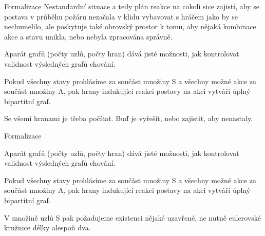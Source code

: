 ﻿\documentclass[a4paper]{beamer}
\def\uv#1{\char92\relax #1\char34\relax}
\begin{document}
\begin{frame}{Formalizace}
    Nestandardní situace a tedy plán \uv{reakce na cokoli} sice zajistí, aby se postava v průběhu požáru nezačala v klidu vybavovat s hráčem jako by se nechumelilo, ale poskytuje také obrovský prostor k tomu, aby nějaká kombinace akce a stavu unikla, nebo nebyla zpracována správně.
    
    \vfill
    Aparát grafů (počty uzlů, počty hran) dává jisté možnosti, jak kontrolovat validnost výsledných grafů chování.
    
    \vfill
    Pokud všechny stavy prohlásíme za součást množiny S a všechny možné akce za součást množiny A, pak hrany indukující reakci postavy na akci vytváří úplný bipartitní graf. 

    Se všemi hranami je třeba počítat. Buď je vyřešit, nebo zajistit, aby nenastaly. 
\end{frame}

\begin{frame}{Formalizace}

    \vfill
    Aparát grafů (počty uzlů, počty hran) dává jisté možnosti, jak kontrolovat validnost výsledných grafů chování.
    
    \vfill
    Pokud všechny stavy prohlásíme za součást množiny S a všechny možné akce za součást množiny A, pak hrany indukující reakci postavy na akci vytváří úplný bipartitní graf. 
    
     \vfill
    V množině uzlů S pak požadujeme existenci nějaké uzavřené, ne nutně eulerovské kružnice délky alespoň dva. 
    
\end{frame}



    
    
    

\end{document}
